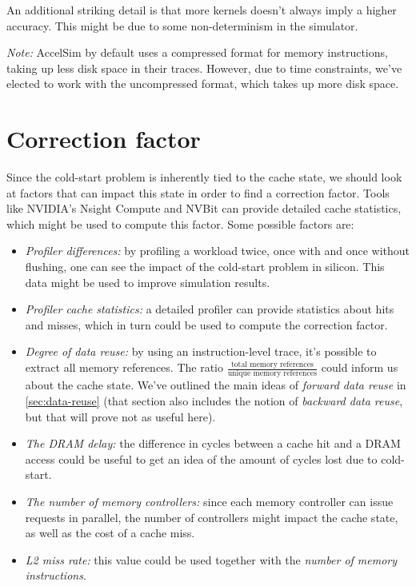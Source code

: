 An additional striking detail is that more kernels doesn't always imply a higher accuracy.
This might be due to some non-determinism in the simulator.

\textit{Note:} AccelSim by default uses a compressed format for memory instructions, taking up less disk space in their traces.
However, due to time constraints, we've elected to work with the uncompressed format, which takes up more disk space.

\FloatBarrier

\section{Correction factor}\label{sec:correction-factor}

Since the cold-start problem is inherently tied to the cache state, we should look at factors that can impact this state in order to find a correction factor.
Tools like NVIDIA's Nsight Compute\cite{nsight} and NVBit\cite{nvbit} can provide detailed cache statistics, which might be used to compute this factor.
Some possible factors are:
\begin{itemize}
    \item \textit{Profiler differences:} by profiling a workload twice, once with and once without flushing, one can see the impact of the cold-start problem in silicon.
    This data might be used to improve simulation results.
    \item \textit{Profiler cache statistics:} a detailed profiler can provide statistics about hits and misses, which in turn could be used to compute the correction factor.
    \item \textit{Degree of data reuse:} by using an instruction-level trace, it's possible to extract all memory references.
    The ratio $\frac{\text{total memory references}}{\text{unique memory references}}$ could inform us about the cache state.
    We've outlined the main ideas of \textit{forward data reuse} in \cref{sec:data-reuse} (that section also includes the notion of \textit{backward data reuse}, but that will prove not as useful here).
    \item \textit{The DRAM delay:} the difference in cycles between a cache hit and a DRAM access could be useful to get an idea of the amount of cycles lost due to cold-start.
    \item \textit{The number of memory controllers:} since each memory controller can issue requests in parallel, the number of controllers might impact the cache state, as well as the cost of a cache miss.
    \item \textit{L2 miss rate:} this value could be used together with the \textit{number of memory instructions}.
\end{itemize}

